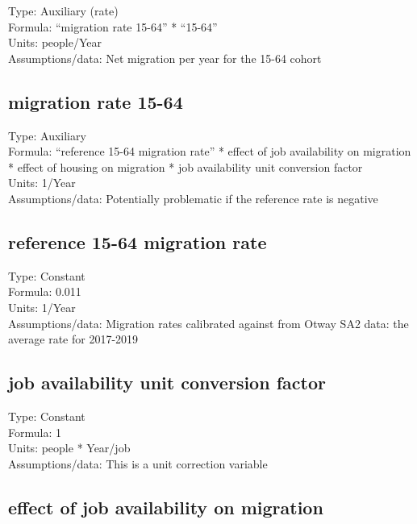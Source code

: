 \documentclass[
  11pt,
]{book}
\begin{document}
Type: Auxiliary (rate)\\
Formula: ``migration rate 15-64'' * ``15-64''\\
Units: people/Year\\
Assumptions/data: Net migration per year for the 15-64 cohort

\hypertarget{migration-rate-15-64}{%
\subsection{migration rate 15-64}\label{migration-rate-15-64}}

Type: Auxiliary\\
Formula: ``reference 15-64 migration rate'' * effect of job availability on migration * effect of housing on migration * job availability unit conversion factor\\
Units: 1/Year\\
Assumptions/data: Potentially problematic if the reference rate is negative

\hypertarget{reference-15-64-migration-rate}{%
\subsection{reference 15-64 migration rate}\label{reference-15-64-migration-rate}}

Type: Constant\\
Formula: 0.011\\
Units: 1/Year\\
Assumptions/data: Migration rates calibrated against from Otway SA2 data: the average rate for 2017-2019

\hypertarget{job-availability-unit-conversion-factor}{%
\subsection{job availability unit conversion factor}\label{job-availability-unit-conversion-factor}}

Type: Constant\\
Formula: 1\\
Units: people * Year/job\\
Assumptions/data: This is a unit correction variable

\hypertarget{effect-of-job-availability-on-migration}{%
\subsection{effect of job availability on migration}\label{effect-of-job-availability-on-migration}}
\end{document}
